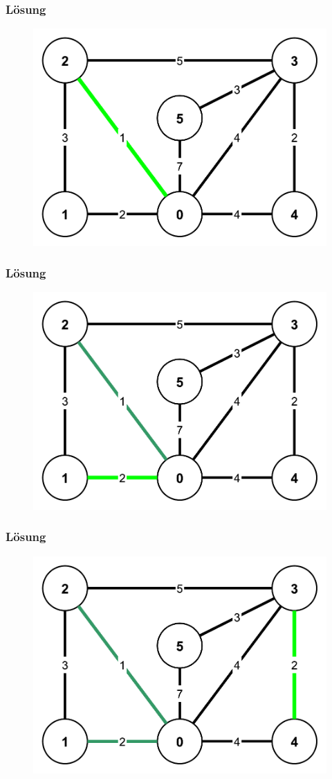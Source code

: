 \begin{frame}
\frametitle{Lösung}
\begin{figure}
\includegraphics[width=0.75\linewidth]{kruskal_graphs/step1.pdf}
\end{figure}
\end{frame}

\begin{frame}
\frametitle{Lösung}
\begin{figure}
\includegraphics[width=0.75\linewidth]{kruskal_graphs/step2.pdf}
\end{figure}
\end{frame}

\begin{frame}
\frametitle{Lösung}
\begin{figure}
\includegraphics[width=0.75\linewidth]{kruskal_graphs/step3.pdf}
\end{figure}
\end{frame}

